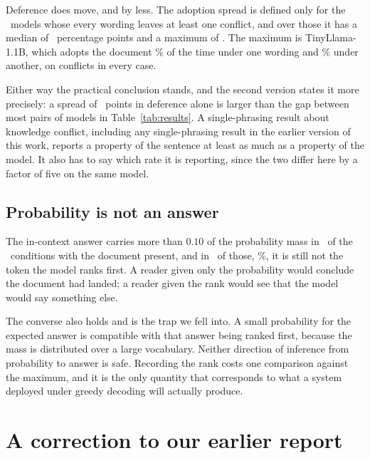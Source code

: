 \documentclass{article}
\begin{document}
Deference does move, and by less. The adoption spread is defined only for the
\NAdoptSpread\ models whose every wording leaves at least one conflict, and over
those it has a median of \MedianAdoptSpread\ percentage points and a maximum of
\MaxAdoptSpread. The maximum is TinyLlama-1.1B, which adopts the document
\TinyAdoptLow\% of the time under one wording and \TinyAdoptHigh\% under
another, on conflicts in every case.

Either way the practical conclusion stands, and the second version states it
more precisely: a spread of \MaxAdoptSpread\ points in deference alone is larger
than the gap between most pairs of models in Table~\ref{tab:results}. A
single-phrasing result about knowledge conflict, including any single-phrasing
result in the earlier version of this work, reports a property of the sentence
at least as much as a property of the model. It also has to say which rate it is
reporting, since the two differ here by a factor of five on the same model.

\subsection{Probability is not an answer}
\label{sec:rank}

The in-context answer carries more than $0.10$ of the probability mass in
\ProbOverTen\ of the \NDoc\ conditions with the document present, and in
\ProbOverTenNotTop\ of those, \ProbOverTenNotTopPct\%, it is still not the token
the model ranks first. A reader given only the probability would conclude the
document had landed; a reader given the rank would see that the model would say
something else.

The converse also holds and is the trap we fell into. A small probability for the
expected answer is compatible with that answer being ranked first, because the
mass is distributed over a large vocabulary. Neither direction of inference from
probability to answer is safe. Recording the rank costs one comparison against
the maximum, and it is the only quantity that corresponds to what a system
deployed under greedy decoding will actually produce.

\section{A correction to our earlier report}
\label{sec:correction}
\end{document}
